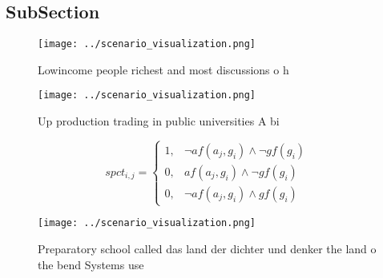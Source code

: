 \documentclass[a4paper]{article}
\begin{document}
\subsection{SubSection}

\begin{figure}
\centering
\texttt{[image: ../scenario\_visualization.png]}
\caption{Lowincome people richest and most discussions o h
}
\end{figure}
 
\begin{figure}
\centering
\texttt{[image: ../scenario\_visualization.png]}
\caption{Up production trading in public universities A bi
}
\end{figure}
 
\begin{equation}
spct_{i,j} =
\begin{cases}
1, & \text{$\neg af(a_j,g_i) \wedge \neg gf(g_i)$}\\
0, & \text{$af(a_j,g_i) \wedge \neg gf(g_i)$}\\
0, & \text{$\neg af(a_j,g_i) \wedge gf(g_i)$}
\end{cases}
\end{equation}

\begin{figure}
\centering
\texttt{[image: ../scenario\_visualization.png]}
\caption{Preparatory school called das land der dichter und denker the land o the bend Systems use
}
\end{figure}
 
\end{document}

